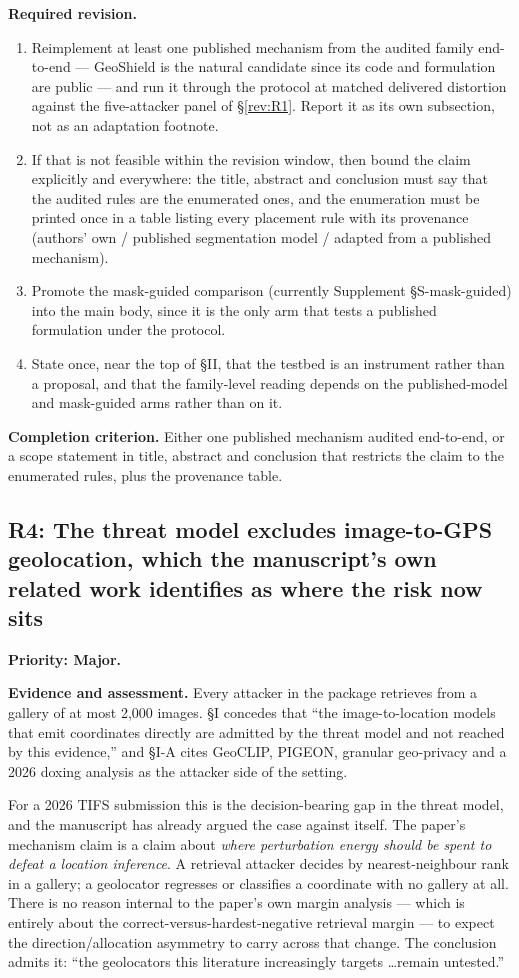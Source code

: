 \documentclass[11pt,a4paper]{article}
\newcommand{\finding}[3]{\subsection{#1: #3}\label{rev:#1}\textbf{Priority: #2.}}
\newcommand{\evidence}{\par\textbf{Evidence and assessment.} }
\newcommand{\action}{\par\textbf{Required revision.} }
\newcommand{\acceptance}{\par\textbf{Completion criterion.} }
\begin{document}
\action
\begin{enumerate}
\item Reimplement at least one published mechanism from the audited family
  end-to-end --- GeoShield is the natural candidate since its code and
  formulation are public --- and run it through the protocol at matched
  delivered distortion against the five-attacker panel of \S\ref{rev:R1}.
  Report it as its own subsection, not as an adaptation footnote.
\item If that is not feasible within the revision window, then bound the claim
  explicitly and everywhere: the title, abstract and conclusion must say that
  the audited rules are the enumerated ones, and the enumeration must be
  printed once in a table listing every placement rule with its provenance
  (authors' own / published segmentation model / adapted from a published
  mechanism).
\item Promote the mask-guided comparison (currently Supplement
  \S S-mask-guided) into the main body, since it is the only arm that tests a
  published formulation under the protocol.
\item State once, near the top of \S II, that the testbed is an instrument
  rather than a proposal, and that the family-level reading depends on the
  published-model and mask-guided arms rather than on it.
\end{enumerate}

\acceptance
Either one published mechanism audited end-to-end, or a scope statement in
title, abstract and conclusion that restricts the claim to the enumerated rules,
plus the provenance table.

\finding{R4}{Major}{The threat model excludes image-to-GPS geolocation, which
the manuscript's own related work identifies as where the risk now sits}

\evidence
Every attacker in the package retrieves from a gallery of at most 2{,}000
images. \S I concedes that ``the image-to-location models that emit coordinates
directly are admitted by the threat model and not reached by this evidence,''
and \S I-A cites GeoCLIP, PIGEON, granular geo-privacy and a 2026 doxing
analysis as the attacker side of the setting.

For a 2026 TIFS submission this is the decision-bearing gap in the threat model,
and the manuscript has already argued the case against itself. The paper's
mechanism claim is a claim about \emph{where perturbation energy should be
spent to defeat a location inference}. A retrieval attacker decides by
nearest-neighbour rank in a gallery; a geolocator regresses or classifies a
coordinate with no gallery at all. There is no reason internal to the paper's
own margin analysis --- which is entirely about the correct-versus-hardest-negative
retrieval margin --- to expect the direction/allocation asymmetry to carry
across that change. The conclusion admits it: ``the geolocators this literature
increasingly targets \ldots remain untested.''
\end{document}
